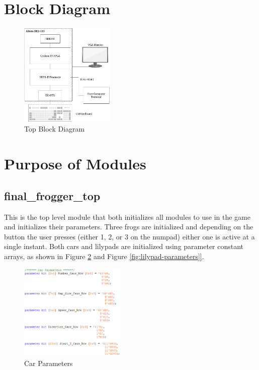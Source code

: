\documentclass[journal, twocolumn, final,11pt,letterpaper]{IEEEtran}
\begin{document}
\section{Block Diagram} 
\begin{figure}[H]
	\centering
	\includegraphics[width=0.4\textwidth]{Block_Diagram.png}
	\caption{Top Block Diagram}
	\label{fig:moving-state}
\end{figure}
 
 
\section{Purpose of Modules}
	
	\subsection{final\_frogger\_top}
	This is the top level module that both initializes all modules to use in the game and initializes their parameters. Three frogs are initialized and depending on the button the user presses (either 1, 2, or 3 on the numpad) either one is active at a single instant. Both cars and lilypads are initialized using parameter constant arrays, as shown in Figure \ref{fig:car-parameters} and Figure \ref{fig:lilypad-parameters]}. 
	\begin{figure}[H]
		\centering
		\includegraphics[width=0.45\textwidth]{car_parameters.png}
		\caption{Car Parameters}
		\label{fig:car-parameters}
	\end{figure}
	
\end{document}
